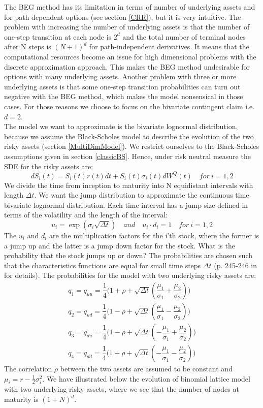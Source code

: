 The BEG method has its limitation in terms of number of underlying assets and for path dependent options (see section \ref{CRR}), but it is very intuitive. The problem with increasing the number of underlying assets is that the number of one-step transition at each node is $2^d$ and the total number of terminal nodes after N steps is $(N+1)^d$ for path-independent derivatives. It means that the computational resources become an issue for high dimensional problems with the discrete approximation approach. This makes the BEG method undesirable for options with many underlying assets. Another problem with three or more underlying assets is that some one-step transition probabilities can turn out negative with the BEG method, which makes the model nonsensical in those cases. For those reasons we choose to focus on the bivariate contingent claim i.e. $d=2$. \\

The model we want to approximate is the bivariate lognormal distribution, because we assume the Black-Scholes model to describe the evolution of the two risky assets (section \ref{MultiDimModel}). We restrict ourselves to the Black-Scholes assumptions given in section \ref{classicBS}. Hence, under risk neutral measure the SDE for the risky assets are:
$$dS_i(t)=S_i(t)r(t)dt+S_i(t)\sigma_i(t)dW^Q(t) \quad for \ i=1,2$$
We divide the time from inception to maturity into N equidistant intervals with length $\Delta t$. We want the jump distribution to approximate the continuous time bivariate lognormal distribution. Each time interval has a jump size defined in terms of the volatility and the length of the interval:
$$u_i=\exp(\sigma_i \sqrt{\Delta t}) \quad and \quad u_i \cdot d_i = 1 \quad for \ i=1,2$$
The $u_i$ and $d_i$ are the multiplication factors for the i'th stock, where the former is a jump up and the latter is a jump down factor for the stock. What is the probability that the stock jumps up or down? The probabilities are chosen such that the characteristics functions are equal for small time steps $\Delta t$ (p. 245-246 in \parencite{BEG} for details). The probabilities for the model with two underlying risky assets are:
\begin{equation}
\begin{split}
q_1=q_{uu}=\dfrac{1}{4}\bigg( 1+\rho + \sqrt{\Delta t}(\dfrac{\mu_1}{\sigma_1} + \dfrac{\mu_2}{\sigma_2}) \bigg)\\
q_2=q_{ud}=\dfrac{1}{4}\bigg( 1-\rho + \sqrt{\Delta t}(\dfrac{\mu_1}{\sigma_1} - \dfrac{\mu_2}{\sigma_2}) \bigg)\\
q_3=q_{du}=\dfrac{1}{4}\bigg( 1-\rho + \sqrt{\Delta t}(-\dfrac{\mu_1}{\sigma_1} + \dfrac{\mu_2}{\sigma_2}) \bigg)\\
q_4=q_{dd}=\dfrac{1}{4}\bigg( 1+\rho + \sqrt{\Delta t}(-\dfrac{\mu_1}{\sigma_1} - \dfrac{\mu_2}{\sigma_2}) \bigg)
\end{split}
\end{equation} 
The correlation $\rho$ between the two assets are assumed to be constant and $\mu_i=r-\frac{1}{2}\sigma_i^2$. We have illustrated below the evolution of binomial lattice model with two underlying risky assets, where we see that the number of nodes at maturity is $(1+N)^d$. 


